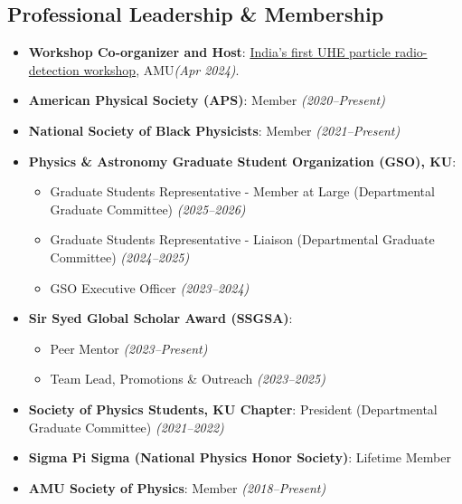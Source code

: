 \documentclass[10pt,letterpaper]{report}
\newcommand{\cvdate}[1]{{\normalfont\itshape\color{Muted}(#1)}}
\begin{document}
\subsection*{Professional Leadership \& Membership}
\begin{itemize}
    \item \textbf{Workshop Co-organizer and Host}: \href{https://indico.ku.edu/event/388/overview}{India's first UHE particle radio-detection workshop}, AMU\cvdate{Apr 2024}.
    \item \textbf{American Physical Society (APS)}: Member  
    \cvdate{2020--Present}
    \item \textbf{National Society of Black Physicists}: Member \cvdate{2021--Present}
    \item \textbf{Physics \& Astronomy Graduate Student Organization (GSO), KU}:
    \begin{itemize}[label={\color{black}$\checkmark$}]
        \item Graduate Students Representative - Member at Large (Departmental Graduate Committee)  \cvdate{2025--2026}
        \item Graduate Students Representative - Liaison (Departmental Graduate Committee)  \cvdate{2024--2025}
        \item GSO Executive Officer  \cvdate{2023--2024}
    \end{itemize}%
    \item \textbf{Sir Syed Global Scholar Award (SSGSA)}:
    \begin{itemize}[label={\color{black}$\checkmark$}]
        \item Peer Mentor \cvdate{2023--Present}
        \item Team Lead, Promotions \& Outreach \cvdate{2023--2025}
    \end{itemize}
    \item \textbf{Society of Physics Students, KU Chapter}: President (Departmental Graduate Committee) \cvdate{2021--2022}
    \item \textbf{Sigma Pi Sigma (National Physics Honor Society)}: Lifetime Member
    \item \textbf{AMU Society of Physics}: Member \cvdate{2018--Present}
\end{itemize}

\end{document}
